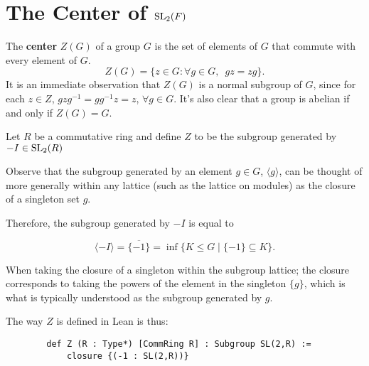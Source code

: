 \section{The Center of $\operatorname{SL}_2(F)$}

\begin{definition}
The \textbf{center} $Z(G)$ of a group $G$ is the set of elements of  $G$ that commute with every element of $G$.
\begin {equation*} Z(G) = \{ z \in G : \forall g \in G, \hspace{6pt} gz=zg \}. \end{equation*}
It is an immediate observation that $Z(G)$ is a normal subgroup of $G$, 
since for each $z \in Z$, $gzg^{-1} = gg^{-1}z = z$, $\forall g \in G$. It's also clear that a group is abelian if and only if $Z(G)=G$.
\end{definition}

\begin{definition}
\label{SpecialSubgroups.Z}
\leanok
    Let $R$ be a commutative ring and define $Z$ to be the subgroup generated by $- I \in \operatorname{SL}_2(R)$
\end{definition}

\begin{remark}
    Observe that the subgroup generated by an element $g \in G$, $\langle g \rangle$, 
    can be thought of more generally within any lattice (such as the lattice on modules) as the closure of a singleton set ${g}$. 
    
    Therefore, the subgroup generated by $-I$ is equal to
    
    \[\langle -I \rangle = \overline{\{-1\}} = \inf \{ K \le G \; | \; \{-1\} \subseteq K \}.\]

    When taking the closure of a singleton within the subgroup lattice; 
    the closure corresponds to taking the powers of the element in the singleton $\{g\}$,
    which is what is typically understood as the subgroup generated by $g$.

    The way $Z$ is defined in Lean is thus:

    \begin{footnotesize} 
    \begin{verbatim}
        def Z (R : Type*) [CommRing R] : Subgroup SL(2,R) := 
            closure {(-1 : SL(2,R))}
    \end{verbatim}
    \end{footnotesize}
\end{remark}

